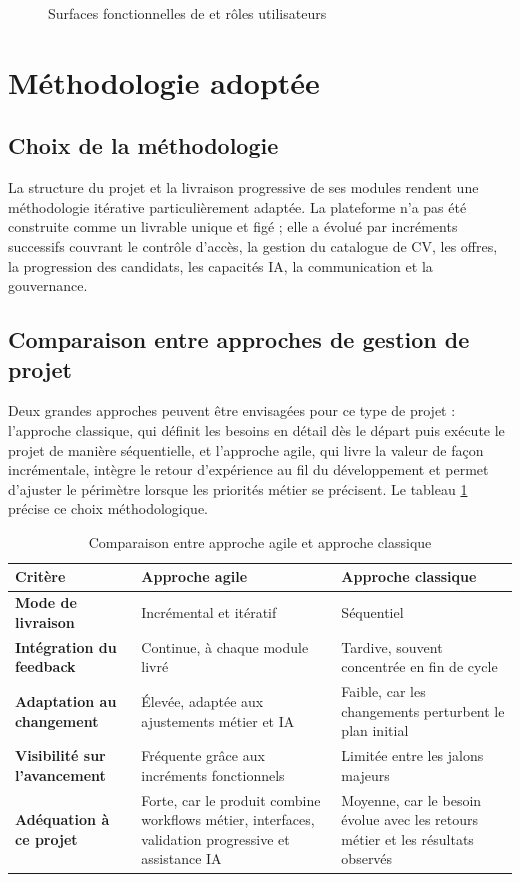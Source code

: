 \begin{figure}[H]
  \centering
  \caption{\label{fig:product-surfaces}Surfaces fonctionnelles de \projectname{} et rôles utilisateurs}
\end{figure}

\section{Méthodologie adoptée}

\subsection{Choix de la méthodologie}
La structure du projet et la livraison progressive de ses modules rendent une méthodologie itérative particulièrement adaptée. La plateforme n'a pas été construite comme un livrable unique et figé ; elle a évolué par incréments successifs couvrant le contrôle d'accès, la gestion du catalogue de CV, les offres, la progression des candidats, les capacités IA, la communication et la gouvernance.

\subsection{Comparaison entre approches de gestion de projet}
Deux grandes approches peuvent être envisagées pour ce type de projet : l'approche classique, qui définit les besoins en détail dès le départ puis exécute le projet de manière séquentielle, et l'approche agile, qui livre la valeur de façon incrémentale, intègre le retour d'expérience au fil du développement et permet d'ajuster le périmètre lorsque les priorités métier se précisent. Le tableau \ref{tab:methodology-comparison} précise ce choix méthodologique.

\begin{table}[H]
  \centering
  \caption{\label{tab:methodology-comparison}Comparaison entre approche agile et approche classique}
  \begin{tabularx}{\textwidth}{>{\bfseries}p{3.4cm}XX}
    \toprule
    Critère & Approche agile & Approche classique \\
    \midrule
    Mode de livraison & Incrémental et itératif & Séquentiel \\
    Intégration du feedback & Continue, à chaque module livré & Tardive, souvent concentrée en fin de cycle \\
    Adaptation au changement & Élevée, adaptée aux ajustements métier et IA & Faible, car les changements perturbent le plan initial \\
    Visibilité sur l'avancement & Fréquente grâce aux incréments fonctionnels & Limitée entre les jalons majeurs \\
    Adéquation à ce projet & Forte, car le produit combine workflows métier, interfaces, validation progressive et assistance IA & Moyenne, car le besoin évolue avec les retours métier et les résultats observés \\
    \bottomrule
  \end{tabularx}
\end{table}

